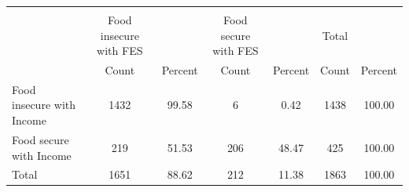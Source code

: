 {
\def\sym#1{\ifmmode^{#1}\else\(^{#1}\)\fi}
\begin{tabular}{l*{3}{cc}}
\hline\hline
            &\multicolumn{6}{c}{}                                                                           \\
            &Food insecure with FES&               &Food secure with FES&               &          Total&               \\
            &          Count&        Percent&          Count&        Percent&          Count&        Percent\\
\hline
Food insecure with Income&           1432&          99.58&              6&           0.42&           1438&         100.00\\
Food secure with Income&            219&          51.53&            206&          48.47&            425&         100.00\\
Total       &           1651&          88.62&            212&          11.38&           1863&         100.00\\
\hline\hline
\end{tabular}
}
